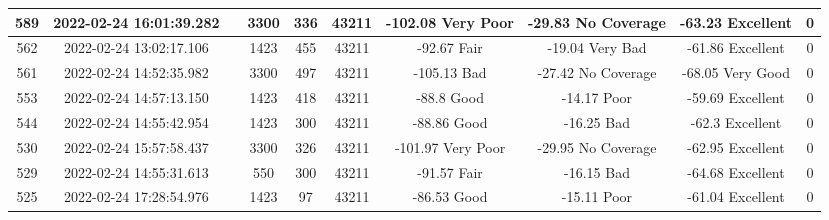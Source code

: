 \begin{longtable*}{|c|c|c|c|c|c|c|c|c|c|}
589&2022-02-24 16:01:39.282&&3300&336&43211& -102.08   Very Poor   & -29.83    No Coverage & -63.23    Excellent   & 0\\\hline
{}562&2022-02-24 13:02:17.106&&1423&455&43211& -92.67    Fair        & -19.04    Very Bad    & -61.86    Excellent   & 0\\\hline
{}561&2022-02-24 14:52:35.982&&3300&497&43211& -105.13   Bad         & -27.42    No Coverage & -68.05    Very Good   & 0\\\hline
{}553&2022-02-24 14:57:13.150&&1423&418&43211& -88.8     Good        & -14.17    Poor        & -59.69    Excellent   & 0\\\hline
{}544&2022-02-24 14:55:42.954&&1423&300&43211& -88.86    Good        & -16.25    Bad         & -62.3     Excellent   & 0\\\hline
{}530&2022-02-24 15:57:58.437&&3300&326&43211& -101.97   Very Poor   & -29.95    No Coverage & -62.95    Excellent   & 0\\\hline
{}529&2022-02-24 14:55:31.613&&550&300&43211& -91.57    Fair        & -16.15    Bad         & -64.68    Excellent   & 0\\\hline
{}525&2022-02-24 17:28:54.976&&1423&97&43211& -86.53    Good        & -15.11    Poor        & -61.04    Excellent   & 0\\\hline

\end{longtable*}
